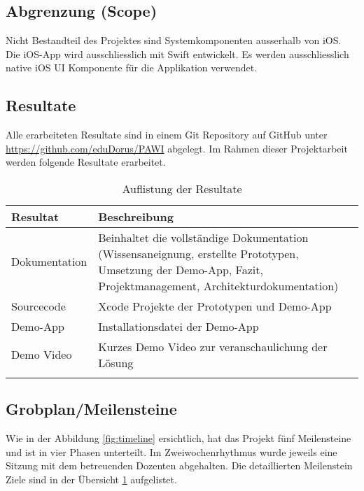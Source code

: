 \subsection{Abgrenzung (Scope)}
Nicht Bestandteil des Projektes sind Systemkomponenten ausserhalb von iOS. Die iOS-App wird ausschliesslich mit Swift entwickelt. Es werden ausschliesslich native iOS UI Komponente für die Applikation verwendet.

\subsection{Resultate}
Alle erarbeiteten Resultate sind in einem Git Repository auf GitHub unter \url{https://github.com/eduDorus/PAWI} abgelegt. Im Rahmen dieser Projektarbeit werden folgende Resultate erarbeitet. 
 
\begin{longtable}{l p{12.5cm}}
	\hline
	\textbf{Resultat} & \textbf{Beschreibung} \\
	\hline
	Dokumentation & Beinhaltet die vollständige Dokumentation (Wissensaneignung, erstellte Prototypen, Umsetzung der Demo-App, Fazit, Projektmanagement, Architekturdokumentation) \\
	Sourcecode & Xcode Projekte der Prototypen und Demo-App \\
	Demo-App & Installationsdatei der Demo-App \\
	Demo Video & Kurzes Demo Video zur veranschaulichung der Lösung \\
	\hline
	\caption{Auflistung der Resultate}
	\label{tab:meilensteine}
\end{longtable}

\subsection{Grobplan/Meilensteine}

Wie in der Abbildung \ref{fig:timeline} ersichtlich, hat das Projekt fünf Meilensteine und ist in vier Phasen unterteilt. Im Zweiwochenrhythmus wurde jeweils eine Sitzung mit dem betreuenden Dozenten abgehalten. Die detaillierten Meilenstein Ziele sind in der Übersicht \ref{tab:meilensteine} aufgelistet.


